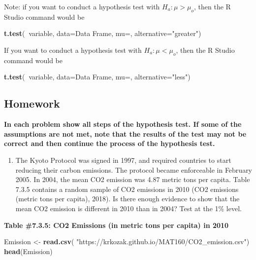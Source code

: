 \documentclass[
]{book}
\newenvironment{Shaded}{\begin{snugshade}}{\end{snugshade}}
\newcommand{\DataTypeTok}[1]{\textcolor[rgb]{0.13,0.29,0.53}{#1}}
\newcommand{\KeywordTok}[1]{\textcolor[rgb]{0.13,0.29,0.53}{\textbf{#1}}}
\newcommand{\NormalTok}[1]{#1}
\newcommand{\OperatorTok}[1]{\textcolor[rgb]{0.81,0.36,0.00}{\textbf{#1}}}
\newcommand{\StringTok}[1]{\textcolor[rgb]{0.31,0.60,0.02}{#1}}
\providecommand{\tightlist}{%
  \setlength{\itemsep}{0pt}\setlength{\parskip}{0pt}}
\begin{document}
Note: if you want to conduct a hypothesis test with \(H_a:\mu>\mu_o\), then the R Studio command would be

\begin{Shaded}
\begin{Highlighting}[]
\KeywordTok{t.test}\NormalTok{(}\OperatorTok{~}\NormalTok{variable, }\DataTypeTok{data=}\NormalTok{Data Frame, }\DataTypeTok{mu=}\NormalTok{, }\DataTypeTok{alternative=}\StringTok{"greater"}\NormalTok{)}
\end{Highlighting}
\end{Shaded}

If you want to conduct a hypothesis test with \(H_a:\mu<\mu_o\), then the R Studio command would be

\begin{Shaded}
\begin{Highlighting}[]
\KeywordTok{t.test}\NormalTok{(}\OperatorTok{~}\NormalTok{variable, }\DataTypeTok{data=}\NormalTok{Data Frame, }\DataTypeTok{mu=}\NormalTok{, }\DataTypeTok{alternative=}\StringTok{"less"}\NormalTok{)}
\end{Highlighting}
\end{Shaded}

\hypertarget{homework-18}{%
\subsection{Homework}\label{homework-18}}

\textbf{In each problem show all steps of the hypothesis test. If some of the assumptions are not met, note that the results of the test may not be correct and then continue the process of the hypothesis test.}

\begin{enumerate}
\def\labelenumi{\arabic{enumi}.}
\tightlist
\item
  The Kyoto Protocol was signed in 1997, and required countries to start reducing their carbon emissions. The protocol became enforceable in February 2005. In 2004, the mean CO2 emission was 4.87 metric tons per capita. Table 7.3.5 contains a random sample of CO2 emissions in 2010 (CO2 emissions (metric tons per capita), 2018). Is there enough evidence to show that the mean CO2 emission is different in 2010 than in 2004? Test at the 1\% level.
\end{enumerate}

\textbf{Table \#7.3.5: CO2 Emissions (in metric tons per capita) in 2010}

\begin{Shaded}
\begin{Highlighting}[]
\NormalTok{Emission <-}\StringTok{ }\KeywordTok{read.csv}\NormalTok{(}
  \StringTok{"https://krkozak.github.io/MAT160/CO2_emission.csv"}\NormalTok{)}
\KeywordTok{head}\NormalTok{(Emission)}
\end{Highlighting}
\end{Shaded}
\end{document}
